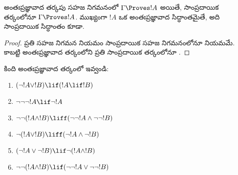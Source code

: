 \documentclass[../../../include/open-logic-section]{subfiles}
\begin{document}
\begin{prop}
  అంతఃప్రజ్ఞావాద తర్కపు సహజ నిగమనంలో
  $\Gamma \Proves !A$ అయితే, సాంప్రదాయిక తర్కంలోనూ
  $\Gamma \Proves !A$. ముఖ్యంగా $!A$ ఒక
  అంతఃప్రజ్ఞావాద సిద్ధాంతమైతే, అది సాంప్రదాయిక
  సిద్ధాంతం కూడా.
\end{prop}

\begin{proof}
  ప్రతి సహజ నిగమన నియమం సాంప్రదాయిక సహజ
  నిగమనంలోనూ నియమమే. కాబట్టి అంతఃప్రజ్ఞావాద
  తర్కంలోని ప్రతి 
  సాంప్రదాయిక తర్కంలోనూ
  .
\end{proof}

\begin{prob}
  కింది 
  అంతఃప్రజ్ఞావాద తర్కంలో  ఇవ్వండి:
  \begin{enumerate}
    \item $(\lnot !A \lor !B) \lif (!A \lif !B)$
    \item $\lnot\lnot\lnot !A \lif \lnot !A$
    \item $\lnot\lnot (!A \land !B) \liff (\lnot\lnot !A\land \lnot \lnot !B)$
    \item $\lnot (!A \lor !B) \liff (\lnot !A \land \lnot !B)$
    \item $(\lnot !A \lor \lnot !B) \lif \lnot (!A \land !B)$
    \item $\lnot\lnot ( !A \land !B) \lif  (\lnot\lnot !A \lor
    \lnot\lnot !B)$
  \end{enumerate}
\end{prob}
\end{document}
